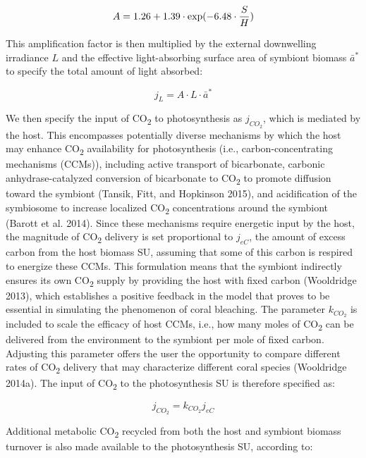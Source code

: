 \documentclass[]{elsarticle} %
\begin{document}
\begin{equation} A = 1.26 + 1.39 \cdot \exp(-6.48 \cdot {S \over H}) \end{equation}

This amplification factor is then multiplied by the external downwelling
irradiance \(L\) and the effective light-absorbing surface area of
symbiont biomass \(\bar{a}^*\) to specify the total amount of light
absorbed:

\begin{equation} j_L =  A \cdot L \cdot \bar{a}^* \end{equation}

We then specify the input of CO\textsubscript{2} to photosynthesis as
\(j_{CO_2}\), which is mediated by the host. This encompasses
potentially diverse mechanisms by which the host may enhance
CO\textsubscript{2} availability for photosynthesis (i.e.,
carbon-concentrating mechanisms (CCMs)), including active transport of
bicarbonate, carbonic anhydrase-catalyzed conversion of bicarbonate to
CO\textsubscript{2} to promote diffusion toward the symbiont (Tansik,
Fitt, and Hopkinson 2015), and acidification of the symbiosome to
increase localized CO\textsubscript{2} concentrations around the
symbiont (Barott et al. 2014). Since these mechanisms require energetic
input by the host, the magnitude of CO\textsubscript{2} delivery is set
proportional to \(j_{eC}\), the amount of excess carbon from the host
biomass SU, assuming that some of this carbon is respired to energize
these CCMs. This formulation means that the symbiont indirectly ensures
its own CO\textsubscript{2} supply by providing the host with fixed
carbon (Wooldridge 2013), which establishes a positive feedback in the
model that proves to be essential in simulating the phenomenon of coral
bleaching. The parameter \(k_{CO_2}\) is included to scale the efficacy
of host CCMs, i.e., how many moles of CO\textsubscript{2} can be
delivered from the environment to the symbiont per mole of fixed carbon.
Adjusting this parameter offers the user the opportunity to compare
different rates of CO\textsubscript{2} delivery that may characterize
different coral species (Wooldridge 2014a). The input of
CO\textsubscript{2} to the photosynthesis SU is therefore specified as:

\begin{equation} j_{CO_2} = k_{CO_2}j_{eC} \end{equation}

Additional metabolic CO\textsubscript{2} recycled from both the host and
symbiont biomass turnover is also made available to the photosynthesis
SU, according to:
\end{document}

